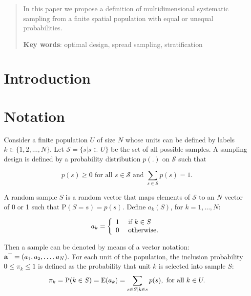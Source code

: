 \documentclass[12pt,english]{article}\usepackage[]{graphicx}\usepackage{xcolor}
\begin{document}
\maketitle




\begin{abstract}
In this paper we propose a definition of multidimensional systematic sampling from a finite spatial population with equal or unequal probabilities.

\textbf{Key words}: optimal design, spread sampling, stratification
\end{abstract}
\newpage


\section{Introduction}


\section{Notation}


Consider a finite population $U$ of size $N$ whose units can be defined by labels $k\in\{1,2,\dots,N\}$. Let $\mathcal{S} = \{s | s\subset U\}$ be the set of all possible samples. A sampling design is defined by a probability distribution $p(.)$ on $\mathcal{S}$ such that

$$
p(s) \geq 0 \text{ for all } s\in \mathcal{S} \text{ and }\sum_{ s\in \mathcal{S}}p(s) = 1.
$$

A random sample $S$ is a random vector that maps elements of $\mathcal{S}$ to an $N$ vector of 0 or 1 such that $\textrm{P}(S = s) =
p(s)$. Define $a_k(S)$, for $k = 1,\dots,N$:

$$
a_k =
\left\{\begin{array}{lll} 1 & \text{ if } k\in S\\ 0 & \text{ otherwise} . \end{array} \right.
$$

Then a sample can be denoted by means of a vector notation:
$
 \textbf{a}^\top = (a_1,a_2,\dots,a_N).
$ For each unit of the population, the inclusion probability $0\leq\pi_k\leq 1$ is defined as the probability that unit $k$ is selected into sample $S$:
\begin{equation*}\label{eq:pik}
 \pi_k = \textrm{P}(k \in S) = \textrm{E}(a_k) =  \sum_{s\in S | k \in s} p(s), \text{ for all } k\in U.
\end{equation*}
\end{document}
